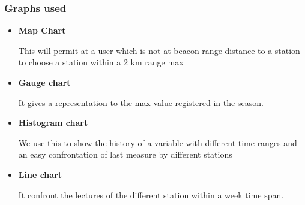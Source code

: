 \documentclass[12pt]{article} %
\begin{document}
\subsubsection{Graphs used}
\begin{itemize}
\item \textbf{Map Chart}

This will permit at a user which is not at beacon-range distance to a station to choose a station within a 2 km range max 

\item \textbf{Gauge chart}

It gives a representation to the max value registered in the season.

\item \textbf{Histogram chart}

We use this to show the history of a variable with different time ranges and an easy confrontation of last measure by different stations

\item \textbf{Line chart}

It confront the lectures of the different station within a week time span.
\end{itemize}
\end{document}
